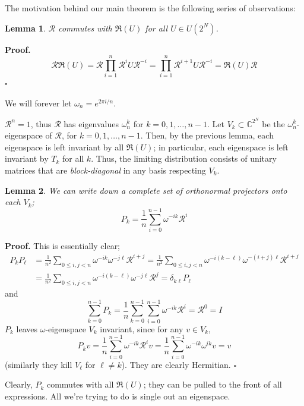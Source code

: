\documentclass[fleqn,12pt]{article}
\newcommand{\CC}{\mathbb{C}}
\newtheorem{lemma}{Lemma}
\newenvironment*{proof}{\begin{trivlist}\item[]{\bf Proof.}}{\hfill$\square$\end{trivlist}}
\begin{document}
The motivation behind our main theorem is the following series of observations:
\begin{lemma}
    $\mathcal{R}$ commutes with $\mathfrak{R}(U)$ for all $U\in U(2^N)$.
\end{lemma}
\begin{proof}
    \[
        \mathcal{R} \mathfrak{R}(U) = \mathcal{R} \prod_{i = 1}^n \mathcal{R}^i U \mathcal{R}^{-i}
        = \prod_{i = 1}^n \mathcal{R}^{i+1} U \mathcal{R}^{-i} = \mathfrak{R}(U)\mathcal{R}
    \]
\end{proof}
We will forever let $\omega_n = e^{2\pi i / n}$.

$\mathcal{R}^n = 1$, thus $\mathcal{R}$ has eigenvalues $\omega_n^k$ for
$k = 0, 1, \ldots, n-1$.
Let $V_k \subset \CC^{2^N}$ be the $\omega_n^k$-eigenspace of $\mathcal{R}$,
for $k = 0, 1, \ldots, n-1$.
Then, by the previous lemma, each eigenspace is left
invariant by all $\mathfrak{R}(U)$; in particular,
each eigenspace is left invariant by $T_k$ for all $k$.
Thus, the limiting distribution consists of unitary matrices
that are \emph{block-diagonal} in any basis respecting $V_k$.

\begin{lemma}
    We can write down a complete set of orthonormal projectors
    onto each $V_k$;
    \[
        P_k = \frac{1}{n}\sum_{i = 0}^{n-1} \omega^{-ik} \mathcal{R}^i
    \]
\end{lemma}
\begin{proof}
    This is essentially clear;
    \begin{align*}
        P_k P_\ell & = \frac1{n^2} \sum_{0\leq i,j < n} \omega^{-ik} \omega^{-j\ell} \mathcal{R}^{i+j}
        = \frac1{n^2} \sum_{0\leq i,j < n} \omega^{-i(k - \ell)} \omega^{-(i + j)\ell} \mathcal{R}^{i + j}                           \\
                   & = \frac1{n^2} \sum_{0\leq i,j < n} \omega^{-i(k - \ell)} \omega^{-j\ell} \mathcal{R}^j  = \delta_{k\ell} P_\ell
    \end{align*}
    and
    \[
        \sum_{k = 0}^{n-1} P_k = \frac1n \sum_{k = 0}^{n-1} \sum_{i = 0}^{n-1} \omega^{-ik} \mathcal{R}^i
        = \mathcal{R}^0 = I
    \]
    $P_k$ leaves $\omega$-eigenspace $V_k$ invariant, since for any $v\in V_k$,
    \[
        P_k v = \frac{1}{n} \sum_{i = 0}^{n-1} \omega^{-ik} \mathcal{R}^i v
        = \frac{1}{n} \sum_{i = 0}^{n-1} \omega^{-ik} \omega^{ik} v = v
    \]
    (similarly they kill $V_\ell$ for $\ell \neq k$). They are clearly Hermitian.
\end{proof}
Clearly, $P_k$ commutes with all $\mathfrak{R}(U)$; they
can be pulled to the front of all expressions.
All we're trying to do is single out an eigenspace.
\end{document}
